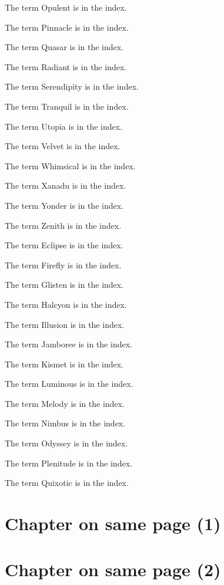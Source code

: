 The term Opulent  is in the index.

The term Pinnacle  is in the index.

The term Quasar  is in the index.

The term Radiant  is in the index.

The term Serendipity  is in the index.

The term Tranquil  is in the index.

The term Utopia  is in the index.

The term Velvet  is in the index.

The term Whimsical  is in the index.

The term Xanadu  is in the index.

The term Yonder  is in the index.

The term Zenith  is in the index.

The term Eclipse  is in the index.

The term Firefly  is in the index.

The term Glisten  is in the index.

The term Halcyon  is in the index.

The term Illusion  is in the index.

The term Jamboree  is in the index.

The term Kismet  is in the index.

The term Luminous  is in the index.

The term Melody  is in the index.

The term Nimbus  is in the index.

The term Odyssey  is in the index.

The term Plenitude  is in the index.

The term Quixotic  is in the index.



\chapter{Chapter on same page (1)}

{\let\clearpage\relax\chapter{Chapter on same page (2)}}

\stopcontents